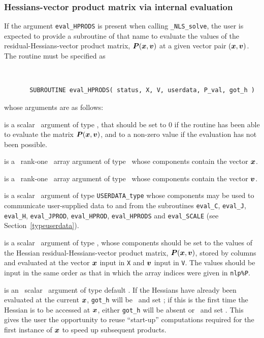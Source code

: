 \documentclass{galahad}
\newcommand{\packagename}{NLS}
\newcommand{\fullpackagename}{\libraryname\_\packagename}
\newcommand{\solver}{{\tt \fullpackagename\_solve}}
\begin{document}

\subsubsection{Hessians-vector product matrix via internal evaluation\label{hpfv}}

If the argument {\tt eval\_HPRODS} is present when calling \solver, the
user is expected to provide a subroutine of that name to evaluate the
values of the residual-Hessians-vector product matrix, ${\bm{P}}({\bm{x}},{\bm{v}})$
at a given vector pair $({\bm{x}},{\bm{v}})$.
The routine must be specified as
\def\baselinestretch{0.8}
{\tt
\begin{verbatim}
       SUBROUTINE eval_HPRODS( status, X, V, userdata, P_val, got_h )
\end{verbatim} }
\def\baselinestretch{1.0}
\noindent whose arguments are as follows:

\begin{description}
 is a scalar \intentout\ argument of type \integer,
that should be set to 0 if the routine has been able to evaluate the
matrix ${\bm{P}}({\bm{x}},{\bm{v}})$,
and to a non-zero value if the evaluation has not been possible.

 is a \ rank-one \intentin\ array argument of type
\realdp\ whose components contain the vector ${\bm{x}}$.

 is a \ rank-one \intentin\ array argument of type
\realdp\ whose components contain the vector ${\bm{v}}$.

 is a scalar \intentinout\ argument of type
{\tt USERDATA\_type} whose components may be used
to communicate user-supplied data to and from the subroutines
{\tt eval\_C}, {\tt eval\_J}, {\tt eval\_H}, {\tt eval\_JPROD},
{\tt eval\_HPROD}, {\tt eval\_HPRODS} and {\tt eval\_SCALE}
(see Section~\ref{typeuserdata}).

 is a scalar \intentout\ argument of type \realdp,
whose components should be set to the values of the Hessian
residual-Hessians-vector product matrix, ${\bm{P}}({\bm{x}},{\bm{v}})$,
stored by columns and evaluated at the vector ${\bm{x}}$ input in {\tt X}
and ${\bm{v}}$ input in {\tt V}.
The values should be input in the same order as that in which the array
indices were given in {\tt nlp\%P}.

 is an \optional\ scalar \intentin\ argument of type default
\logical. If the Hessians have already been evaluated at the current
${\bm{x}}$, {\tt got\_h} will be \present\ and set \true; if this is the first time
the Hessian is to be accessed at ${\bm{x}}$, either {\tt got\_h} will
be absent or \present\ and set \false. This gives the user the opportunity
to reuse ``start-up'' computations required for the first instance of
${\bm{x}}$ to speed up subsequent products.

\end{description}
\end{document}
